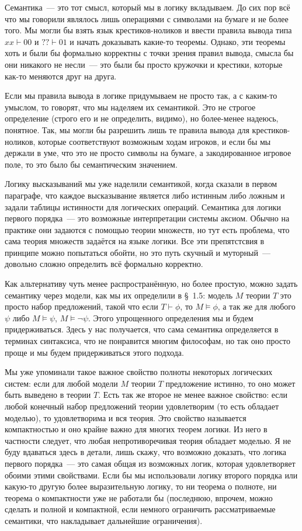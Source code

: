 Семантика~--- это тот смысл, который мы в логику вкладываем. До сих пор всё что мы говорили являлось лишь операциями с символами на бумаге и не более того. Мы могли бы взять язык крестиков-ноликов и ввести правила вывода типа $xx\vdash00$ и $??\vdash01$ и начать доказывать какие-то теоремы. Однако, эти теоремы хоть и были бы формально корректны с точки зрения правил вывода, смысла бы они никакого не несли~--- это были бы просто кружочки и крестики, которые как-то меняются друг на друга. 

Если мы правила вывода в логике придумываем не просто так, а с каким-то умыслом, то говорят, что мы наделяем их семантикой. Это не строгое определение (строго его и не определить, видимо), но более-менее надеюсь, понятное. Так, мы могли бы разрешить лишь те правила вывода для крестиков-ноликов, которые соответствуют возможным ходам игроков, и если бы мы держали в уме, что это не просто символы на бумаге, а закодированное игровое поле, то это было бы семантическим значением.

Логику высказываний мы уже наделили семантикой, когда сказали в первом параграфе, что каждое высказывание является либо истинным либо ложным и задали таблицы истинности для логических операций. Семантика для логики первого порядка~--- это возможные интерпретации системы аксиом. Обычно на практике они задаются с помощью теории множеств, но тут есть проблема, что сама теория множеств задаётся на языке логики. Все эти препятстсвия в принципе можно попытаться обойти, но это путь скучный и муторный~--- довольно сложно определить всё формально корректно.

Как альтернативу чуть менее распространённую, но более простую, можно задать семантику через модели, как мы их определили в \S~1.5: модель $M$ теории $T$ это просто набор предложений, такой что если $T\vdash\phi$, то $M\models \phi$, а так же для любого $\psi$ либо $M\models \psi$, $M\models \neg\psi$. Этого упрощенного определения мы и будем придерживаться. Здесь у нас получается, что сама семантика определяется в терминах синтаксиса, что не понравится многим философам, но так оно просто проще и мы будем придерживаться этого подхода.

Мы уже упоминали такое важное свойство полноты некоторых логических систем: если для любой модели $M$ теории $T$ предложение истинно, то оно может быть выведено в теории $T$. Есть так же второе не менее важное свойство: если любой конечный набор предложений теории удовлетворим (то есть обладает моделью), то удовлетворима и вся теория. Это свойство называется компактностью и оно крайне важно для многих теорем логики. Из него в частности следует, что любая непротиворечивая теория обладает моделью. Я не буду вдаваться здесь в детали, лишь скажу, что возможно доказать, что логика первого порядка~--- это самая общая из возможных логик, которая удовлетворяет обоими этими свойствами. Если бы мы использовали логику второго порядка или какую-то другую более выразительную логику, то ни теорема о полноте, ни теорема о компактности уже не работали бы (последнюю, впрочем, можно сделать и полной и компактной, если немного ограничить рассматриваемые семантики, что накладывает дальнейшие ограничения).


